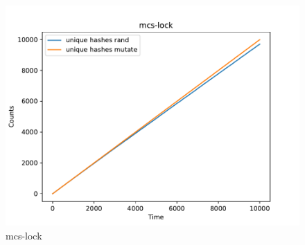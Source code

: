 \begin{figure}[H]
    \vspace{0.5cm}
    
    \begin{minipage}{0.45\textwidth}
        \centering
        \includegraphics[width=\textwidth]{figure/mcs-lock.pdf}
        \caption{mcs-lock}
        \label{cover-plot1-mcs-lock}
    \end{minipage}
    \hfill
    \begin{minipage}{0.45\textwidth}
        \centering
    \end{minipage}
    
    
    
\end{figure}



